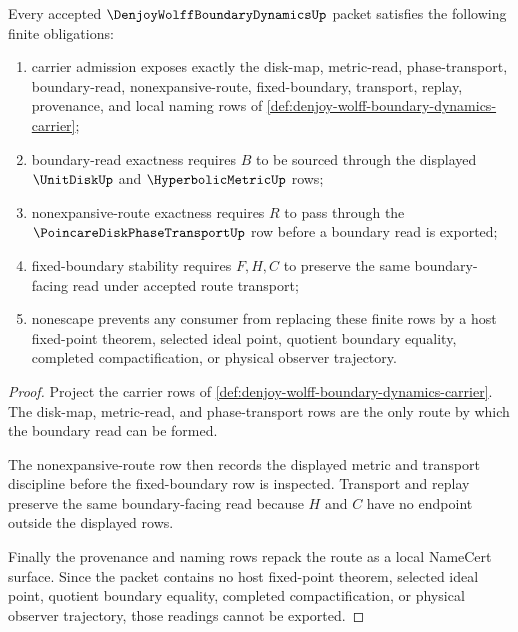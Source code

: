 \begin{theorem}
\label{thm:denjoy-wolff-boundary-dynamics-namecert-obligations}
Every accepted $\DenjoyWolffBoundaryDynamicsUp$ packet satisfies the following finite obligations:
\begin{enumerate}
\item carrier admission exposes exactly the disk-map, metric-read, phase-transport, boundary-read, nonexpansive-route, fixed-boundary, transport, replay, provenance, and local naming rows of \autoref{def:denjoy-wolff-boundary-dynamics-carrier};
\item boundary-read exactness requires $B$ to be sourced through the displayed $\UnitDiskUp$ and $\HyperbolicMetricUp$ rows;
\item nonexpansive-route exactness requires $R$ to pass through the $\PoincareDiskPhaseTransportUp$ row before a boundary read is exported;
\item fixed-boundary stability requires $F,H,C$ to preserve the same boundary-facing read under accepted route transport;
\item nonescape prevents any consumer from replacing these finite rows by a host fixed-point theorem, selected ideal point, quotient boundary equality, completed compactification, or physical observer trajectory.
\end{enumerate}
\end{theorem}
\begin{proof}
Project the carrier rows of \autoref{def:denjoy-wolff-boundary-dynamics-carrier}. The disk-map, metric-read, and phase-transport rows are the only route by which the boundary read can be formed.

The nonexpansive-route row then records the displayed metric and transport discipline before the fixed-boundary row is inspected. Transport and replay preserve the same boundary-facing read because $H$ and $C$ have no endpoint outside the displayed rows.

Finally the provenance and naming rows repack the route as a local NameCert surface. Since the packet contains no host fixed-point theorem, selected ideal point, quotient boundary equality, completed compactification, or physical observer trajectory, those readings cannot be exported.
\end{proof}


